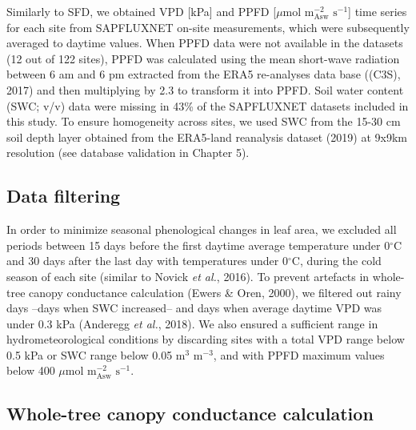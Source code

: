 \documentclass[11pt,twoside]{reedthesis}
\begin{document}
Similarly to SFD, we obtained VPD {[}kPa{]} and PPFD {[}\(\mu\)mol
\(\text{m}^{-2}_{\text{Asw}}\) \(\text{s}^{-1}\){]} time series for each
site from SAPFLUXNET on-site measurements, which were subsequently
averaged to daytime values. When PPFD data were not available in the
datasets (12 out of 122 sites), PPFD was calculated using the mean
short-wave radiation between 6 am and 6 pm extracted from the ERA5
re-analyses data base ((C3S), 2017) and then multiplying by 2.3 to
transform it into PPFD. Soil water content (SWC; v/v) data were missing
in 43\% of the SAPFLUXNET datasets included in this study. To ensure
homogeneity across sites, we used SWC from the 15-30 cm soil depth layer
obtained from the ERA5-land reanalysis dataset (2019) at 9x9km
resolution (see database validation in Chapter 5).\par

\subsection{Data filtering}\label{data-filtering}

In order to minimize seasonal phenological changes in leaf area, we
excluded all periods between 15 days before the first daytime average
temperature under 0\(^{\circ}\)C and 30 days after the last day with
temperatures under 0\(^{\circ}\)C, during the cold season of each site
(similar to Novick \emph{et al.}, 2016). To prevent artefacts in
whole-tree canopy conductance calculation (Ewers \& Oren, 2000), we
filtered out rainy days --days when SWC increased-- and days when
average daytime VPD was under 0.3 kPa (Anderegg \emph{et al.}, 2018). We
also ensured a sufficient range in hydrometeorological conditions by
discarding sites with a total VPD range below 0.5 kPa or SWC range below
0.05 \(\text{m}^{3}\) \(\text{m}^{-3}\), and with PPFD maximum values
below 400 \(\mu\)mol \(\text{m}^{-2}_{\text{Asw}}\)
\(\text{s}^{-1}\).\par

\subsection{Whole-tree canopy conductance
calculation}\label{whole-tree-canopy-conductance-calculation}
\end{document}
